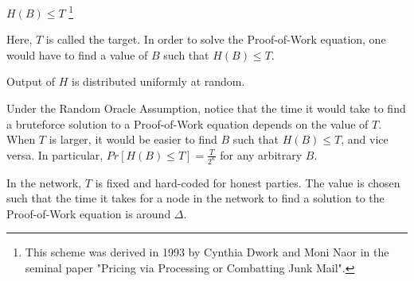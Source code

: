 



\begin{definition}
  $H(B) \leq T$
  \footnote{This scheme was derived in 1993 by Cynthia Dwork and Moni Naor in the seminal paper "Pricing via Processing
or Combatting Junk Mail".}
\end{definition}

Here, $T$ is called the target. In order to solve the Proof-of-Work equation, one would have to find a value of $B$ such that $H(B) \leq T$.

\begin{definition}
  Output of $H$ is distributed uniformly at random.
\end{definition}

Under the Random Oracle Assumption, notice that the time it would take to find a bruteforce solution to a Proof-of-Work equation depends on the value of $T$. When $T$ is larger, it would be easier to find $B$ such that $H(B) \leq T$, and vice versa. In particular, $Pr[H(B) \leq T] = \frac{T}{2^{\kappa}}$ for any arbitrary $B$.

In the network, $T$ is fixed and hard-coded for honest parties. The value is chosen such that the time it takes for a node in the network to find a solution to the Proof-of-Work equation is around $\Delta$.

